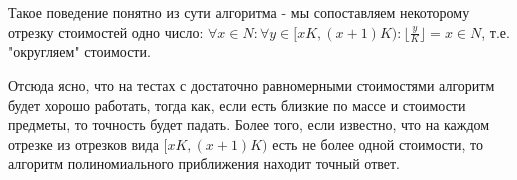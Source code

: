 \documentclass{article}
\begin{document}
	Такое поведение понятно из сути алгоритма - мы сопоставляем некоторому отрезку стоимостей одно число:  $\forall x \in N: \forall y \in [x K, (x+1) K) :\lfloor\frac{y}{K}\rfloor = x \in N$, т.е. "округляем" стоимости. 
	
	Отсюда ясно, что на тестах с достаточно равномерными стоимостями алгоритм будет хорошо работать, тогда как, если есть близкие по массе и стоимости предметы, то точность будет падать. Более того, если известно, что на каждом отрезке из отрезков вида $[x K, (x + 1) K)$ есть не более одной стоимости, то алгоритм полиномиального приближения находит точный ответ.
	
\end{document}
